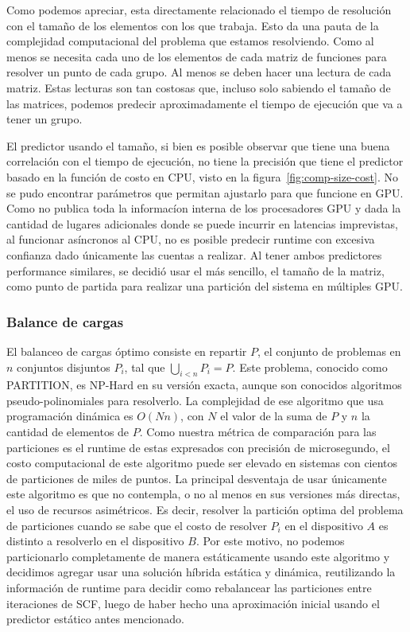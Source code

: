 Como podemos apreciar, esta directamente relacionado el tiempo de resoluci\'on con el tama\~no
de los elementos con los que trabaja. Esto da una pauta de la complejidad computacional del problema
que estamos resolviendo. Como al menos se necesita cada uno de los elementos de cada matriz de funciones
para resolver un punto de cada grupo. Al menos se deben hacer una lectura de cada matriz. Estas lecturas
son tan costosas que, incluso solo sabiendo el tama\~no de las matrices, podemos predecir aproximadamente
el tiempo de ejecuci\'on que va a tener un grupo.

El predictor usando el tama\~no, si bien es posible observar que tiene una buena correlaci\'on con el tiempo de ejecuci\'on,
no tiene la precisi\'on que tiene el predictor basado en la funci\'on de costo en CPU, visto en la figura~\ref{fig:comp-size-cost}.
No se pudo encontrar par\'ametros que permitan ajustarlo para que funcione en GPU. Como \nvidia no publica toda la informac\'ion
interna de los procesadores GPU y dada la cantidad de lugares adicionales donde se puede incurrir en latencias
imprevistas, al funcionar as\'incronos al CPU, no es posible predecir runtime con excesiva confianza dado \'unicamente
las cuentas a realizar. Al tener ambos predictores performance similares, se decidi\'o usar el m\'as sencillo, el
tama\~no de la matriz, como punto de partida para realizar una partici\'on del sistema en m\'ultiples GPU.

\subsubsection{Balance de cargas}
El balanceo de cargas \'optimo consiste en repartir $P$, el conjunto de problemas en
$n$ conjuntos disjuntos $P_i$, tal que $\bigcup_{i<n} P_i = P$. Este problema, conocido como PARTITION,
es NP-Hard en su versi\'on exacta, aunque son conocidos algoritmos pseudo-polinomiales para resolverlo.
La complejidad de ese algoritmo que usa programaci\'on din\'amica es $O(Nn)$, con $N$ el valor
de la suma de $P$ y $n$ la cantidad de elementos de $P$. Como nuestra m\'etrica de comparaci\'on para las
particiones es el runtime de estas expresados con precisi\'on de microsegundo, el costo computacional
de este algoritmo puede ser elevado en sistemas con cientos de particiones de miles de puntos.
La principal desventaja de usar \'unicamente este algoritmo es que no contempla, o no al menos
en sus versiones m\'as directas, el uso de recursos asim\'etricos. Es decir, resolver la partici\'on
optima del problema de particiones cuando se sabe que el costo de resolver $P_i$ en el dispositivo
$A$ es distinto a resolverlo en el dispositivo $B$. Por este motivo, no podemos particionarlo completamente
de manera est\'aticamente
usando este algoritmo y decidimos agregar usar una soluci\'on h\'ibrida est\'atica y din\'amica, reutilizando
la informaci\'on de runtime para decidir como rebalancear las particiones entre iteraciones de SCF, luego
de haber hecho una aproximaci\'on inicial usando el predictor est\'atico antes mencionado.

